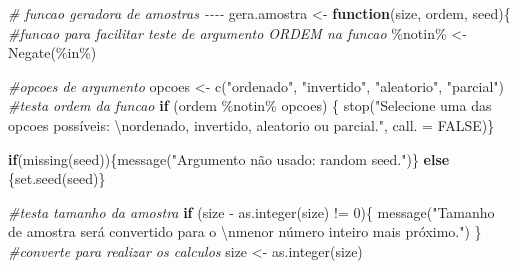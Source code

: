 \documentclass[
]{article}
\newenvironment{Shaded}{\begin{snugshade}}{\end{snugshade}}
\newcommand{\AttributeTok}[1]{\textcolor[rgb]{0.77,0.63,0.00}{#1}}
\newcommand{\CommentTok}[1]{\textcolor[rgb]{0.56,0.35,0.01}{\textit{#1}}}
\newcommand{\ConstantTok}[1]{\textcolor[rgb]{0.00,0.00,0.00}{#1}}
\newcommand{\ControlFlowTok}[1]{\textcolor[rgb]{0.13,0.29,0.53}{\textbf{#1}}}
\newcommand{\DecValTok}[1]{\textcolor[rgb]{0.00,0.00,0.81}{#1}}
\newcommand{\FunctionTok}[1]{\textcolor[rgb]{0.00,0.00,0.00}{#1}}
\newcommand{\NormalTok}[1]{#1}
\newcommand{\OtherTok}[1]{\textcolor[rgb]{0.56,0.35,0.01}{#1}}
\newcommand{\SpecialCharTok}[1]{\textcolor[rgb]{0.00,0.00,0.00}{#1}}
\newcommand{\StringTok}[1]{\textcolor[rgb]{0.31,0.60,0.02}{#1}}
\begin{document}
\begin{Shaded}
\begin{Highlighting}[]
\CommentTok{\# funcao geradora de amostras {-}{-}{-}{-}}
\NormalTok{gera.amostra }\OtherTok{\textless{}{-}} \ControlFlowTok{function}\NormalTok{(size, ordem, seed)\{}
  \CommentTok{\#funcao para facilitar teste de argumento ORDEM na funcao}
  \StringTok{\textasciigrave{}}\AttributeTok{\%notin\%}\StringTok{\textasciigrave{}} \OtherTok{\textless{}{-}} \FunctionTok{Negate}\NormalTok{(}\StringTok{\textasciigrave{}}\AttributeTok{\%in\%}\StringTok{\textasciigrave{}}\NormalTok{)}
  
  \CommentTok{\#opcoes de argumento}
\NormalTok{  opcoes }\OtherTok{\textless{}{-}} \FunctionTok{c}\NormalTok{(}\StringTok{"ordenado"}\NormalTok{, }\StringTok{"invertido"}\NormalTok{, }\StringTok{"aleatorio"}\NormalTok{, }\StringTok{"parcial"}\NormalTok{)}
  \CommentTok{\#testa ordem da funcao}
  \ControlFlowTok{if}\NormalTok{ (ordem }\SpecialCharTok{\%notin\%}\NormalTok{ opcoes) \{ }
    \FunctionTok{stop}\NormalTok{(}\StringTok{"Selecione uma das opcoes possíveis: }\SpecialCharTok{\textbackslash{}n}\StringTok{ordenado, invertido, aleatorio ou parcial."}\NormalTok{,}
         \AttributeTok{call. =} \ConstantTok{FALSE}\NormalTok{)\}}
  
  \ControlFlowTok{if}\NormalTok{(}\FunctionTok{missing}\NormalTok{(seed))\{}\FunctionTok{message}\NormalTok{(}\StringTok{"Argumento não usado: random seed."}\NormalTok{)\} }
  \ControlFlowTok{else}\NormalTok{ \{}\FunctionTok{set.seed}\NormalTok{(seed)\}}
  
  
  \CommentTok{\#testa tamanho da amostra}
  \ControlFlowTok{if}\NormalTok{ (size }\SpecialCharTok{{-}} \FunctionTok{as.integer}\NormalTok{(size) }\SpecialCharTok{!=} \DecValTok{0}\NormalTok{)\{}
    \FunctionTok{message}\NormalTok{(}\StringTok{"Tamanho de amostra será convertido para o }\SpecialCharTok{\textbackslash{}n}\StringTok{menor número inteiro mais próximo."}\NormalTok{)}
\NormalTok{  \}}
  \CommentTok{\#converte para realizar os calculos}
\NormalTok{  size }\OtherTok{\textless{}{-}} \FunctionTok{as.integer}\NormalTok{(size)}


\end{Highlighting}
\end{Shaded}
\end{document}
